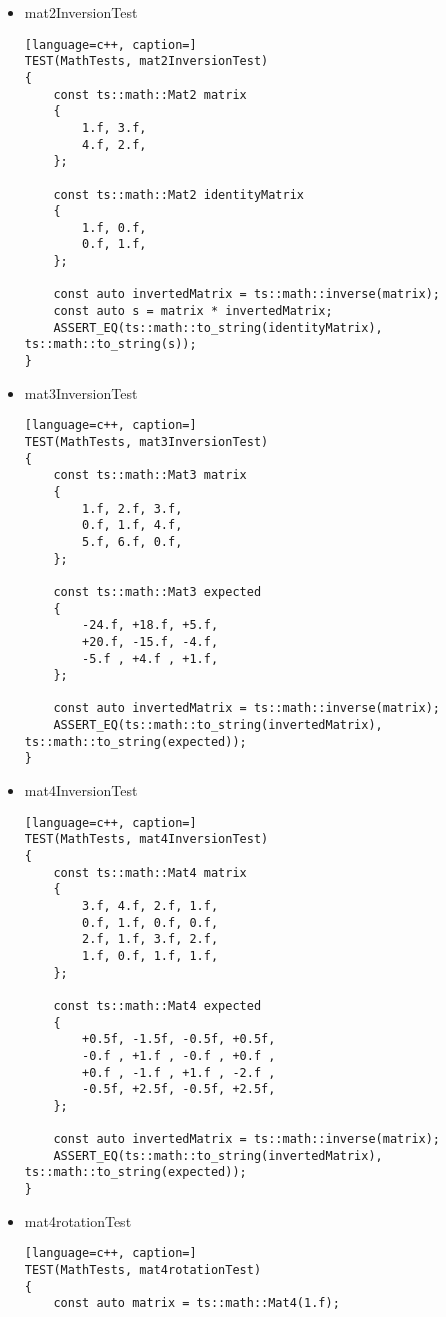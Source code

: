 \begin{itemize}
\begin{itemize}
\begin{lstlisting}[language=c++, caption=]
    const auto multiplication = rightMatrix * leftMatrix;
    ASSERT_EQ(ts::math::to_string(expected), ts::math::to_string(multiplication));
}
            \end{lstlisting}
            \item mat2InversionTest
            \begin{lstlisting}[language=c++, caption=]
TEST(MathTests, mat2InversionTest)
{
    const ts::math::Mat2 matrix
    {
        1.f, 3.f,
        4.f, 2.f,
    };

    const ts::math::Mat2 identityMatrix
    {
        1.f, 0.f,
        0.f, 1.f,
    };

    const auto invertedMatrix = ts::math::inverse(matrix);
    const auto s = matrix * invertedMatrix;
    ASSERT_EQ(ts::math::to_string(identityMatrix), ts::math::to_string(s));
}
            \end{lstlisting}
            \item mat3InversionTest
            \begin{lstlisting}[language=c++, caption=]
TEST(MathTests, mat3InversionTest)
{
    const ts::math::Mat3 matrix
    {
        1.f, 2.f, 3.f,
        0.f, 1.f, 4.f,
        5.f, 6.f, 0.f,
    };

    const ts::math::Mat3 expected
    {
        -24.f, +18.f, +5.f,
        +20.f, -15.f, -4.f,
        -5.f , +4.f , +1.f,
    };

    const auto invertedMatrix = ts::math::inverse(matrix);
    ASSERT_EQ(ts::math::to_string(invertedMatrix), ts::math::to_string(expected));
}
            \end{lstlisting}
            \item mat4InversionTest
            \begin{lstlisting}[language=c++, caption=]
TEST(MathTests, mat4InversionTest)
{
    const ts::math::Mat4 matrix
    {
        3.f, 4.f, 2.f, 1.f,
        0.f, 1.f, 0.f, 0.f,
        2.f, 1.f, 3.f, 2.f,
        1.f, 0.f, 1.f, 1.f,
    };

    const ts::math::Mat4 expected
    {
        +0.5f, -1.5f, -0.5f, +0.5f,
        -0.f , +1.f , -0.f , +0.f ,
        +0.f , -1.f , +1.f , -2.f ,
        -0.5f, +2.5f, -0.5f, +2.5f,
    };

    const auto invertedMatrix = ts::math::inverse(matrix);
    ASSERT_EQ(ts::math::to_string(invertedMatrix), ts::math::to_string(expected));
}
            \end{lstlisting}
            \item mat4rotationTest
            \begin{lstlisting}[language=c++, caption=]
TEST(MathTests, mat4rotationTest)
{
    const auto matrix = ts::math::Mat4(1.f);


\end{lstlisting}
\end{itemize}
\end{itemize}
